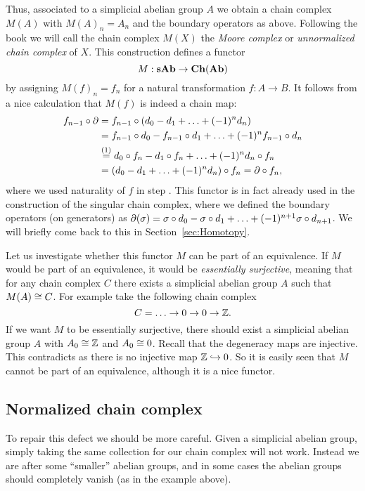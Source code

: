 Thus, associated to a simplicial abelian group $A$ we obtain a chain complex $M(A)$ with $M(A)_n = A_n$ and the boundary operators as above. Following the book \cite{goerss} we will call the chain complex $M(X)$ the \emph{Moore complex} or \emph{unnormalized chain complex} of $X$. This construction defines a functor
$$ M: \mathbf{sAb} \to \mathbf{Ch}(\mathbf{Ab}) $$
by assigning $M(f)_n = f_n$ for a natural transformation $f: A \to B$. It follows from a nice calculation that $M(f)$ is indeed a chain map:
\begin{align*}
	f_{n-1} \circ \partial &= f_{n-1} \circ (d_0 - d_1 + \ldots + (-1)^n d_n) \\
		&= f_{n-1} \circ d_0 - f_{n-1} \circ d_1 + \ldots + (-1)^n f_{n-1} \circ d_n \\
		&\stackrel{(1)}{=} d_0 \circ f_n - d_1 \circ f_n + \ldots + (-1)^n d_n \circ f_n \\
		&= (d_0 - d_1 + \ldots + (-1)^n d_n) \circ f_n = \partial \circ f_n,
\end{align*}
where we used naturality of $f$ in step . This functor is in fact already used in the construction of the singular chain complex, where we defined the boundary operators (on generators) as $\partial(\sigma) = \sigma \circ d_0 - \sigma \circ d_1 + \ldots + (-1)^{n+1} \sigma \circ d_{n+1}$. We will briefly come back to this in Section~\ref{sec:Homotopy}.

Let us investigate whether this functor $M$ can be part of an equivalence. If $M$ would be part of an equivalence, it would be \emph{essentially surjective}, meaning that for any chain complex $C$ there exists a simplicial abelian group $A$ such that $M(A) \cong C$. For example take the following chain complex
$$ C = \ldots \to 0 \to 0 \to \mathbb{Z}. $$
If we want $M$ to be essentially surjective, there should exist a simplicial abelian group $A$ with $A_0 \cong \mathbb{Z}$ and $A_0 \cong 0$. Recall that the degeneracy maps are injective. This contradicts as there is no injective map $\mathbb{Z} \hookrightarrow 0$. So it is easily seen that $M$ cannot be part of an equivalence, although it is a nice functor.


\subsection{Normalized chain complex}
To repair this defect we should be more careful. Given a simplicial abelian group, simply taking the same collection for our chain complex will not work. Instead we are after some ``smaller'' abelian groups, and in some cases the abelian groups should completely vanish (as in the example above).

